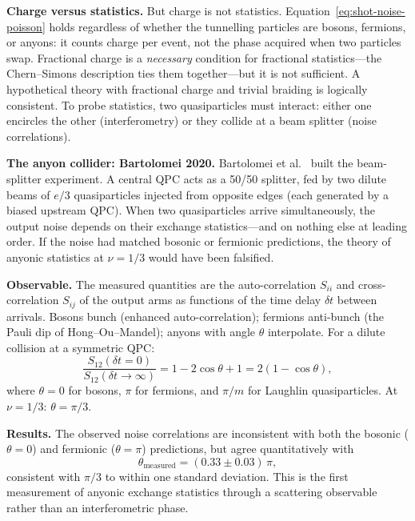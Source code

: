 \medskip
\noindent\textbf{Charge versus statistics.}
But charge is not statistics.  Equation~\eqref{eq:shot-noise-poisson} holds regardless of whether the tunnelling particles are bosons, fermions, or anyons: it counts charge per event, not the phase acquired when two particles swap.  Fractional charge is a \emph{necessary} condition for fractional statistics---the Chern--Simons description ties them together---but it is not sufficient.  A hypothetical theory with fractional charge and trivial braiding is logically consistent.  To probe statistics, two quasiparticles must interact: either one encircles the other (interferometry) or they collide at a beam splitter (noise correlations).

\medskip
\noindent\textbf{The anyon collider: Bartolomei 2020.}
Bartolomei et al.\ \cite{Bartolomei2020AnyonCollisions} built the beam-splitter experiment.  A central QPC acts as a 50/50 splitter, fed by two dilute beams of $e/3$ quasiparticles injected from opposite edges (each generated by a biased upstream QPC).  When two quasiparticles arrive simultaneously, the output noise depends on their exchange statistics---and on nothing else at leading order.  If the noise had matched bosonic or fermionic predictions, the theory of anyonic statistics at $\nu = 1/3$ would have been falsified.

\medskip
\noindent\textbf{Observable.}
The measured quantities are the auto-correlation $S_{ii}$ and cross-correlation $S_{ij}$ of the output arms as functions of the time delay $\delta t$ between arrivals.  Bosons bunch (enhanced auto-correlation); fermions anti-bunch (the Pauli dip of Hong--Ou--Mandel); anyons with angle $\theta$ interpolate.  For a dilute collision at a symmetric QPC:
\begin{equation}
  \frac{S_{12}(\delta t = 0)}{S_{12}(\delta t \to \infty)}
  = 1 - 2\cos\theta + 1 = 2(1 - \cos\theta),
  \label{eq:bartolomei-noise-ratio}
\end{equation}
where $\theta = 0$ for bosons, $\pi$ for fermions, and $\pi/m$ for Laughlin quasiparticles.  At $\nu = 1/3$: $\theta = \pi/3$.

\medskip
\noindent\textbf{Results.}
The observed noise correlations are inconsistent with both the bosonic ($\theta = 0$) and fermionic ($\theta = \pi$) predictions, but agree quantitatively with
\begin{equation}
  \theta_{\mathrm{measured}} = (0.33 \pm 0.03)\,\pi,
  \label{eq:bartolomei-result}
\end{equation}
consistent with $\pi/3$ to within one standard deviation.  This is the first measurement of anyonic exchange statistics through a scattering observable rather than an interferometric phase.

